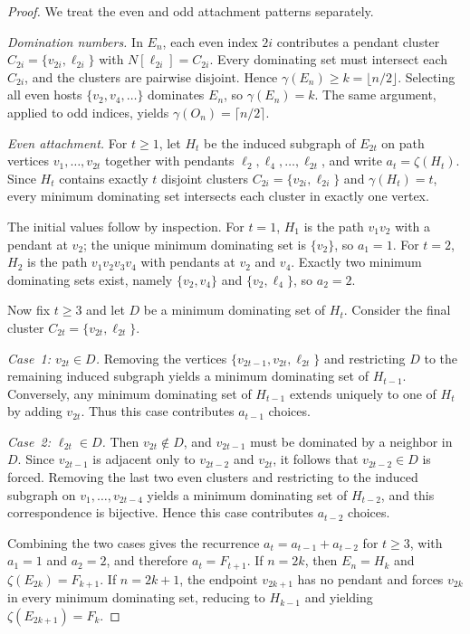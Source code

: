 \documentclass[10pt,a4paper]{amsart}
\begin{document}
\begin{proof}
We treat the even and odd attachment patterns separately.

\smallskip
\noindent\emph{Domination numbers.}
In $E_n$, each even index $2i$ contributes a pendant cluster
$C_{2i}=\{v_{2i},\ell_{2i}\}$ with $N[\ell_{2i}]=C_{2i}$.
Every dominating set must intersect each $C_{2i}$, and the clusters are pairwise disjoint.
Hence $\gamma(E_n)\ge k=\lfloor n/2\rfloor$.
Selecting all even hosts $\{v_2,v_4,\dots\}$ dominates $E_n$, so $\gamma(E_n)=k$.
The same argument, applied to odd indices, yields $\gamma(O_n)=\lceil n/2\rceil$.

\smallskip
\noindent\emph{Even attachment.}
For $t\ge 1$, let $H_t$ be the induced subgraph of $E_{2t}$ on path vertices
$v_1,\dots,v_{2t}$ together with pendants $\ell_2,\ell_4,\dots,\ell_{2t}$,
and write $a_t=\zeta(H_t)$.
Since $H_t$ contains exactly $t$ disjoint clusters $C_{2i}=\{v_{2i},\ell_{2i}\}$ and
$\gamma(H_t)=t$, every minimum dominating set intersects each cluster in exactly one vertex.

The initial values follow by inspection.
For $t=1$, $H_1$ is the path $v_1v_2$ with a pendant at $v_2$; the unique minimum
dominating set is $\{v_2\}$, so $a_1=1$.
For $t=2$, $H_2$ is the path $v_1v_2v_3v_4$ with pendants at $v_2$ and $v_4$.
Exactly two minimum dominating sets exist, namely $\{v_2,v_4\}$ and $\{v_2,\ell_4\}$,
so $a_2=2$.

Now fix $t\ge 3$ and let $D$ be a minimum dominating set of $H_t$.
Consider the final cluster $C_{2t}=\{v_{2t},\ell_{2t}\}$.

\emph{Case~1: $v_{2t}\in D$.}
Removing the vertices $\{v_{2t-1},v_{2t},\ell_{2t}\}$ and restricting $D$ to the
remaining induced subgraph yields a minimum dominating set of $H_{t-1}$.
Conversely, any minimum dominating set of $H_{t-1}$ extends uniquely to one of $H_t$
by adding $v_{2t}$.
Thus this case contributes $a_{t-1}$ choices.

\emph{Case~2: $\ell_{2t}\in D$.}
Then $v_{2t}\notin D$, and $v_{2t-1}$ must be dominated by a neighbor in $D$.
Since $v_{2t-1}$ is adjacent only to $v_{2t-2}$ and $v_{2t}$, it follows that
$v_{2t-2}\in D$ is forced.
Removing the last two even clusters and restricting to the induced subgraph on
$v_1,\dots,v_{2t-4}$ yields a minimum dominating set of $H_{t-2}$, and this correspondence
is bijective.
Hence this case contributes $a_{t-2}$ choices.

Combining the two cases gives the recurrence $a_t=a_{t-1}+a_{t-2}$ for $t\ge 3$,
with $a_1=1$ and $a_2=2$, and therefore $a_t=F_{t+1}$.
If $n=2k$, then $E_n=H_k$ and $\zeta(E_{2k})=F_{k+1}$.
If $n=2k+1$, the endpoint $v_{2k+1}$ has no pendant and forces $v_{2k}$ in every
minimum dominating set, reducing to $H_{k-1}$ and yielding $\zeta(E_{2k+1})=F_k$.


\end{proof}
\end{document}
